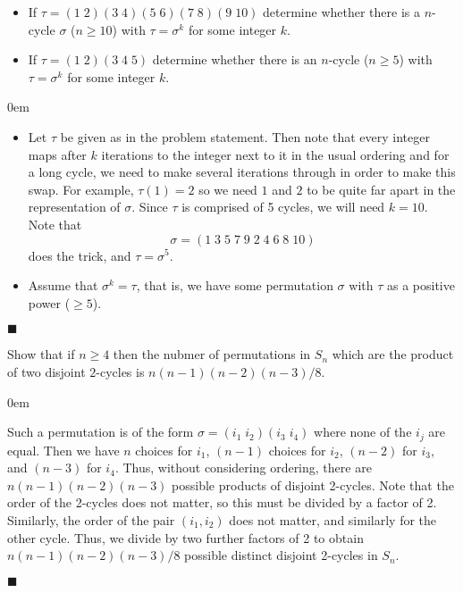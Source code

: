 \documentclass[12pt]{article}
\renewcommand{\qed}{\hfill$\blacksquare$}
\renewenvironment{proof}{\begin{addmargin}[1em]{0em}\begin{newproof}}{\end{newproof}\end{addmargin}\qed}
\newenvironment{problem}[2][Exercise]{\begin{trivlist}
\item[\hskip \labelsep {\bfseries #1}\hskip \labelsep {\bfseries #2.}]}{\end{trivlist}}
\begin{document}
\begin{problem}{1.3.12}
\begin{itemize}
  \item If $\tau = \left(1\;2\right)\left(3\;4\right)\left(5\;6\right)\left(7\;8\right)\left(9\;10\right) $ determine whether there is a $n$-cycle $\sigma$ ($n\geq 10$) with $\tau = \sigma^k$ for some integer $k$.
  \item If $\tau=\left(1\;2\right)\left(3\;4\;5\right)$ determine whether there is an $n$-cycle ($n\geq 5$) with $\tau=\sigma^k$ for some integer $k$.
\end{itemize}
\end{problem}
\begin{proof}
\begin{itemize}
  \item Let $\tau$ be given as in the problem statement. Then note that every integer maps after $k$ iterations to the integer next to it in the usual ordering and for a long cycle, we need to make several iterations through in order to make this swap. For example, $\tau\left(1\right)=2$ so we need $1$ and $2$ to be quite far apart in the representation of $\sigma$. Since $\tau$ is comprised of 5 cycles, we will need $k=10$. Note that
  $$ \sigma = \left(1\;3\;5\;7\;9\;2\;4\;6\;8\;10\right) $$ does the trick, and $\tau = \sigma^5$.
  \item Assume that $\sigma^k=\tau$, that is, we have some permutation $\sigma$ with $\tau$ as a positive power ($\geq 5$).
\end{itemize}
\end{proof}










\begin{problem}{1.3.17}
  Show that if $n\geq 4$ then the nubmer of permutations in $S_n$ which are the product of two disjoint $2$-cycles is $n\left(n-1\right)\left(n-2\right)\left(n-3\right)/8$.
\end{problem}
\begin{proof}
Such a permutation is of the form $\sigma = \left(i_1\;i_2\right)\left(i_3\;i_4\right)$ where none of the $i_j$ are equal. Then we have $n$ choices for $i_1$, $\left(n-1\right)$ choices for $i_2$, $\left(n-2\right)$ for $i_3$, and $\left(n-3\right)$ for $i_4$. Thus, without considering ordering, there are $ n\left(n-1\right)\left(n-2\right) \left(n-3 \right)$ possible products of disjoint 2-cycles. Note that the order of the 2-cycles does not matter, so this must be divided by a factor of 2. Similarly, the order of the pair $\left(i_1,i_2\right)$ does not matter, and similarly for the other cycle. Thus, we divide by two further factors of 2 to obtain $n\left(n-1\right)\left(n-2\right)\left(n-3\right)/8$ possible distinct disjoint 2-cycles in $S_n$.
\end{proof}
\end{document}

